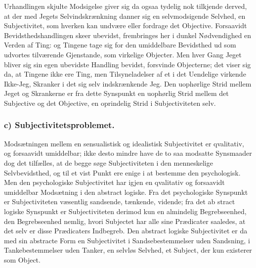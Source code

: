 \documentclass[11pt]{book}
\newcommand{\opage}[1]{\marginnote{\footnotesize\textit{[#1]}}}
\begin{document}
Urhandlingen skjulte
\opage{35} \setcounter{footnote}{0}%
Modsigelse giver sig da ogsaa tydelig nok tilkjende derved, at der med
Jegets Selvindskrænkning danner sig en selvmodsigende Selvhed, en
Subjectivitet, som hverken kan undvære eller fordrage det Objective.
Forsaavidt Bevidsthedshandlingen skeer ubevidst, frembringes her i
dunkel Nødvendighed en Verden af Ting: og Tingene tage sig for den
umiddelbare Bevidsthed ud som udvortes tilværende Gjenstande, som
virkelige Objecter. Men hver Gang Jeget bliver sig sin egen ubevidste
Handling bevidst, forsvinde Objecterne; det viser sig da, at Tingene
ikke ere Ting, men Tilsyneladelser af et i det Uendelige virkende
Ikke-Jeg, Skranker i det sig selv indskrænkende Jeg. Den uophørlige
Strid mellem Jeget og Skrankerne er fra dette Synspunkt en uophørlig
Strid mellem det Subjective og det Objective, en oprindelig Strid i
Subjectiviteten selv.

\subsubsection*{c) Subjectivitetsproblemet.}

Modsætningen mellem en sensualistisk og idealistisk Subjectivitet er
qvalitativ, og forsaavidt umiddelbar; ikke desto mindre have de to saa
modsatte Synsmaader dog det tilfælles, at de begge søge
Subjectiviteten i den menneskelige Selvbevidsthed, og til et vist
Punkt ere enige i at bestemme den psychologisk. Men den psychologiske
Subjectivitet har igjen en qvalitativ og forsaavidt umiddelbar
Modsætning i den abstract logiske. Fra det psychologiske Synspunkt er
Subjectiviteten væsentlig sandsende, tænkende, vidende; fra det ab\-%
\opage{36} \setcounter{footnote}{0}%
stract logiske Synspunkt er Subjectiviteten derimod kun en almindelig
Begrebseenhed, den Begrebseenhed nemlig, hvori Subjectet har alle sine
Prædicater saaledes, at det selv er disse Prædicaters Indbegreb. Den
abstract logiske Subjectivitet er da med sin abstracte Form en
Subjectivitet i Sandsebestemmelser uden Sandsning, i
Tankebestemmelser uden Tanker, en selvløs Selvhed, et Subject, der kun
existerer som Object.
\end{document}
